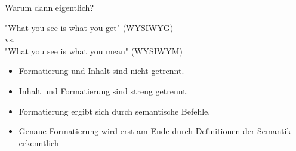 

\begin{frame}{Warum dann eigentlich?}
	\begin{center}
		"What you see is what you get" (WYSIWYG) \pause \\
		vs. \\
		"What you see is what you mean" (WYSIWYM)
	\end{center}
\end{frame}

\begin{frame}
	\begin{description}
		\item<1,2>[WYSIWYG]
		\begin{itemize}
			\item<2>{Formatierung und Inhalt sind nicht getrennt.}
		\end{itemize}
		\item<3-6>[WYSIWYM]
		\begin{itemize}
			\item<4>{Inhalt und Formatierung sind streng getrennt.}
			\item<5>{Formatierung ergibt sich durch semantische Befehle.}
			\item<6>{Genaue Formatierung wird erst am Ende durch Definitionen der Semantik erkenntlich}
		\end{itemize}
	\end{description}
\end{frame}
